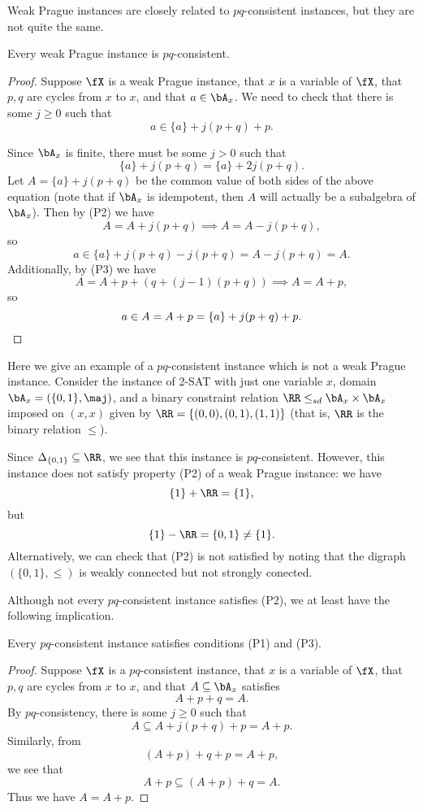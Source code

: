 Weak Prague instances are closely related to $pq$-consistent instances, but they are not quite the same.

\begin{thm}\label{weak-prague-pq} Every weak Prague instance is $pq$-consistent.
\end{thm}
\begin{proof} Suppose $\fX$ is a weak Prague instance, that $x$ is a variable of $\fX$, that $p,q$ are cycles from $x$ to $x$, and that $a \in \bA_x$. We need to check that there is some $j \ge 0$ such that
\[
a \in \{a\} + j(p+q) + p.
\]

Since $\bA_x$ is finite, there must be some $j > 0$ such that
\[
\{a\} + j(p+q) = \{a\} + 2j(p+q).
\]
Let $A = \{a\} + j(p+q)$ be the common value of both sides of the above equation (note that if $\bA_x$ is idempotent, then $A$ will actually be a subalgebra of $\bA_x$). Then by (P2) we have
\[
A = A + j(p+q) \implies A = A - j(p+q),
\]
so
\[
a \in \{a\} + j(p+q) - j(p+q) = A - j(p+q) = A.
\]
Additionally, by (P3) we have
\[
A = A + p + (q + (j-1)(p+q)) \implies A = A + p,
\]
so
\[
a \in A = A + p = \{a\} + j(p+q) + p.\qedhere
\]
\end{proof}

\begin{ex} Here we give an example of a $pq$-consistent instance which is not a weak Prague instance. Consider the instance of 2-SAT with just one variable $x$, domain $\bA_x = (\{0,1\}, \maj)$, and a binary constraint relation $\RR \le_{sd} \bA_x\times \bA_x$ imposed on $(x,x)$ given by $\RR = \{(0,0),(0,1),(1,1)\}$ (that is, $\RR$ is the binary relation $\le$).

Since $\Delta_{\{0,1\}} \subseteq \RR$, we see that this instance is $pq$-consistent. However, this instance does not satisfy property (P2) of a weak Prague instance: we have
\[
\{1\} + \RR = \{1\},
\]
but
\[
\{1\} - \RR = \{0,1\} \ne \{1\}.
\]
Alternatively, we can check that (P2) is not satisfied by noting that the digraph $(\{0,1\},\le)$ is weakly connected but not strongly conected.
\end{ex}

Although not every $pq$-consistent instance satisfies (P2), we at least have the following implication.

\begin{thm}\label{pq-p1-p3} Every $pq$-consistent instance satisfies conditions (P1) and (P3).
\end{thm}
\begin{proof} Suppose $\fX$ is a $pq$-consistent instance, that $x$ is a variable of $\fX$, that $p,q$ are cycles from $x$ to $x$, and that $A \subseteq \bA_x$ satisfies
\[
A + p + q = A.
\]
By $pq$-consistency, there is some $j \ge 0$ such that
\[
A \subseteq A + j(p+q) + p = A + p.
\]
Similarly, from
\[
(A+p) + q+p = A+p,
\]
we see that
\[
A+p \subseteq (A+p) + q = A.
\]
Thus we have $A = A+p$.
\end{proof}

